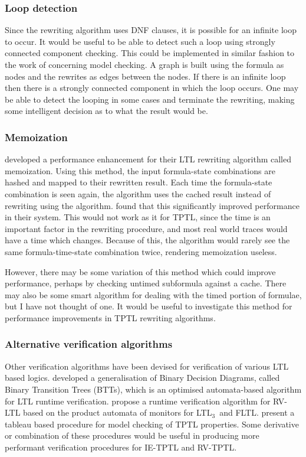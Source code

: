 \documentclass[a4paper]{article}
\newcommand{\ltlt}{LTL$_3$}
\begin{document}
\subsubsection{Loop detection}
Since the rewriting algorithm uses DNF clauses, it is possible for an infinite loop to occur. It would be useful to be able to detect such a loop using strongly connected component checking. This could be implemented in similar fashion to the work of \textcite{lichtenstein1985checking} concerning model checking. A graph is built using the formula as nodes and the rewrites as edges between the nodes. If there is an infinite loop then there is a strongly connected component in which the loop occurs. One may be able to detect the looping in some cases and terminate the rewriting, making some intelligent decision as to what the result would be.

\subsubsection{Memoization}
\textcite[180]{rosu2005rewriting} developed a performance enhancement for their LTL rewriting algorithm called memoization. Using this method, the input formula-state combinations are hashed and mapped to their rewritten result. Each time the formula-state combination is seen again, the algorithm uses the cached result instead of rewriting using the algorithm. \citeauthor{rosu2005rewriting} found that this significantly improved performance in their system. This would not work as it for TPTL, since the time is an important factor in the rewriting procedure, and most real world traces would have a time which changes. Because of this, the algorithm would rarely see the same formula-time-state combination twice, rendering memoization useless.

However, there may be some variation of this method which could improve performance, perhaps by checking untimed subformula against a cache. There may also be some smart algorithm for dealing with the timed portion of formulae, but I have not thought of one. It would be useful to investigate this method for performance improvements in TPTL rewriting algorithms.

\subsubsection{Alternative verification algorithms}
Other verification algorithms have been devised for verification of various LTL based logics. \textcite{rosu2005rewriting} developed a generalisation of Binary Decision Diagrams, called Binary Transition Trees (BTTs), which is an optimised automata-based algorithm for LTL runtime verification. \textcite{bauer2010comparing} propose a runtime verification algorithm for RV-LTL based on the product automata of monitors for \ltlt\ and FLTL. \textcite{alur1994really} present a tableau based procedure for model checking of TPTL properties.
Some derivative or combination of these procedures would be useful in producing more performant verification procedures for IE-TPTL and RV-TPTL.
\end{document}
